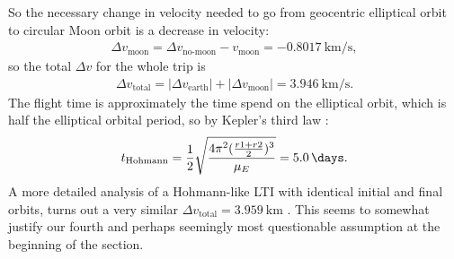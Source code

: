 So the necessary change in velocity needed to go from geocentric elliptical orbit to circular Moon orbit is a decrease in velocity:
\begin{align}
\Delta v_{\text{moon}} = \Delta v_{\text{no-moon}} - v_{\text{moon}} = \SI{-0.8017}{\km\per\s}, \label{eq:deltav-moon}
\end{align}
so the total $\Delta v$ for the whole trip is
\begin{align}
\Delta v_{\text{total}} = |\Delta v_{\text{earth}}| + |\Delta v_{\text{moon}}| = \SI{3.946}{\km\per\s}. \label{eq:hohmann-delta-v}
\end{align}
The flight time is approximately the time spend on the elliptical orbit, which is half the elliptical orbital period, so by Kepler's third law \cite{Murray1999}:
\begin{align}
t_{\text{Hohmann}} = \dfrac{1}{2}\sqrt{\dfrac{4\pi^2 (\frac{r1+r2}{2})^3}{\mu_E}} = \SI{5.0}{\days}. \label{eq:hohmann-flight-time}
\end{align}
A more detailed analysis of a Hohmann-like LTI with identical initial and final orbits, turns out a very similar $\Delta v_{\text{total}} = \SI{3.959}{\km}$ \cite{Sweetser1991} \cite{Juul2008}. This seems to somewhat justify our fourth and perhaps seemingly most questionable assumption at the beginning of the section.

